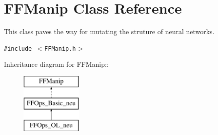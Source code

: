 \section{FFManip Class Reference}
\label{classFFManip}
This class paves the way for mutating the struture of neural networks. 


{\tt \#include $<$FFManip.h$>$}

Inheritance diagram for FFManip::\begin{figure}[H]
\begin{center}
\leavevmode
\includegraphics[height=3cm]{classFFManip}
\end{center}
\end{figure}
